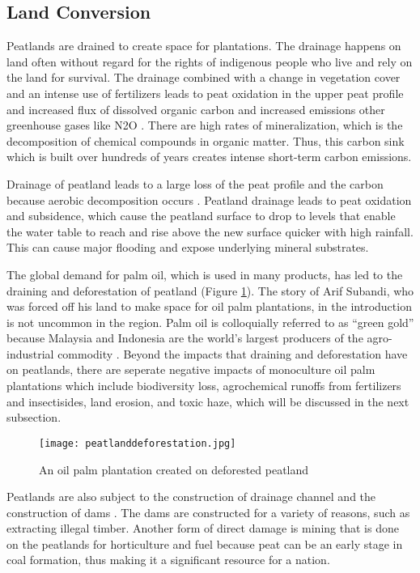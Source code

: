 \subsection{Land Conversion}

Peatlands are drained to create space for plantations. The drainage happens on land often without regard for the rights of indigenous people who live and rely on the land for survival. The drainage combined with a change in vegetation cover and an intense use of fertilizers leads to peat oxidation in the upper peat profile and increased flux of dissolved organic carbon and increased emissions other greenhouse gases like N2O \citep{larmola2013vegetation}. There are high rates of mineralization, which is the decomposition of chemical compounds in organic matter. Thus, this carbon sink which is built over hundreds of years creates intense short-term carbon emissions. 

Drainage of peatland leads to a large loss of the peat profile and the carbon because aerobic decomposition occurs \citep{page2009restoration}. Peatland drainage leads to peat oxidation and subsidence, which cause the peatland surface to drop to levels that enable the water table to reach and rise above the new surface quicker with high rainfall. This can cause major flooding and expose underlying mineral substrates. 

The global demand for palm oil, which is used in many products, has led to the draining and deforestation of peatland (Figure \ref{fig:peatlanddeforestation}). The story of Arif Subandi, who was forced off his land to make space for oil palm plantations, in the introduction is not uncommon in the region. Palm oil is colloquially referred to as ``green gold'' because Malaysia and Indonesia are the world's largest producers of the agro-industrial commodity \citep{othman2003linking}. Beyond the impacts that draining and deforestation have on peatlands, there are seperate negative impacts of monoculture oil palm plantations which include biodiversity loss, agrochemical runoffs from fertilizers and insectisides, land erosion, and toxic haze, which will be discussed in the next subsection.  

\begin{figure}
  \texttt{[image: peatlanddeforestation.jpg]}
  \caption{An oil palm plantation created on deforested peatland}
  \label{fig:peatlanddeforestation}
\end{figure}

Peatlands are also subject to the construction of drainage channel and the construction of dams \citep{suyanto2004role}. The dams are constructed for a variety of reasons, such as extracting illegal timber. Another form of direct damage is mining that is done on the peatlands for horticulture and fuel because peat can be an early stage in coal formation, thus making it a significant resource for a nation. 

